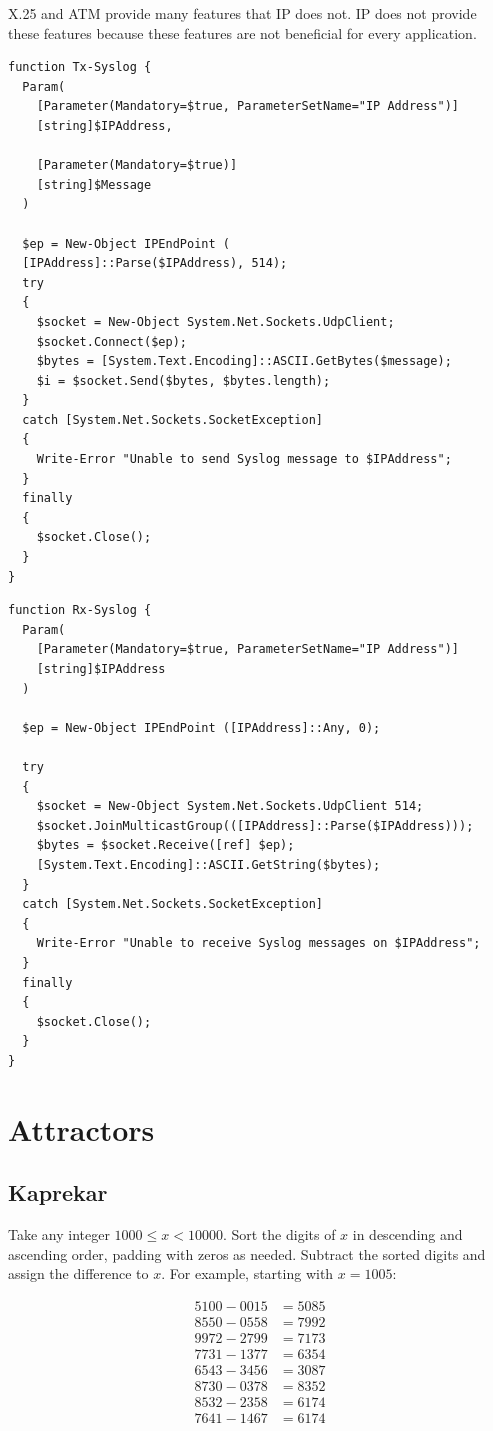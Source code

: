 \documentclass{book}
\begin{document}
X.25 and ATM provide many features that IP does not. IP does not provide these features because these features are not beneficial for every application.

\begin{lstlisting}
function Tx-Syslog {
  Param(
    [Parameter(Mandatory=$true, ParameterSetName="IP Address")]
    [string]$IPAddress,

    [Parameter(Mandatory=$true)]
    [string]$Message
  )

  $ep = New-Object IPEndPoint (
  [IPAddress]::Parse($IPAddress), 514);
  try
  {
    $socket = New-Object System.Net.Sockets.UdpClient;
    $socket.Connect($ep);
    $bytes = [System.Text.Encoding]::ASCII.GetBytes($message);
    $i = $socket.Send($bytes, $bytes.length);
  }
  catch [System.Net.Sockets.SocketException]
  {
    Write-Error "Unable to send Syslog message to $IPAddress";
  }
  finally
  {
    $socket.Close();
  }
}
\end{lstlisting}

\begin{lstlisting}
function Rx-Syslog {
  Param(
    [Parameter(Mandatory=$true, ParameterSetName="IP Address")]
    [string]$IPAddress
  )

  $ep = New-Object IPEndPoint ([IPAddress]::Any, 0);

  try
  {
    $socket = New-Object System.Net.Sockets.UdpClient 514;
    $socket.JoinMulticastGroup(([IPAddress]::Parse($IPAddress)));
    $bytes = $socket.Receive([ref] $ep);
    [System.Text.Encoding]::ASCII.GetString($bytes); 
  }
  catch [System.Net.Sockets.SocketException]
  {
    Write-Error "Unable to receive Syslog messages on $IPAddress";
  }
  finally
  {
    $socket.Close();
  }
}
\end{lstlisting}

\chapter{Attractors}

\section{Kaprekar}

Take any integer $1000 \le x < 10000$. Sort the digits of $x$ in descending and ascending order, padding with zeros as needed. Subtract the sorted digits and assign the difference to $x$. For example, starting with $x = 1005$:

\begin{align*}
5100 - 0015 &= 5085\\
8550 - 0558 &= 7992\\
9972 - 2799 &= 7173\\
7731 - 1377 &= 6354\\
6543 - 3456 &= 3087\\
8730 - 0378 &= 8352\\
8532 - 2358 &= 6174\\
7641 - 1467 &= 6174
\end{align*}
\end{document}
